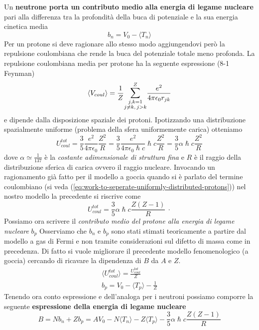 Un \textbf{neutrone porta un contributo medio alla energia di legame nucleare} pari alla differenza tra la profondità della buca di potenziale e la sua energia cinetica media
\[
b_{n} = V_{0} - \langle T_{n} \rangle
\]
Per un protone si deve ragionare allo stesso modo aggiungendovi però la repulsione coulombiana che rende la buca del potenziale totale meno profonda.
La repulsione coulombiana media per protone ha la seguente espressione (8-1 Feynman\cite{FeynLect2})
\[
	\langle V_{coul} \rangle = \frac{1}{Z} \mathlarger{\sum}_{\substack{j,k=1 \\ j \neq k, \,j > k  }}^{Z} \frac{e^{2}}{4 \pi \epsilon_{0}r_{jk}}\]
e dipende dalla disposizione spaziale dei protoni.
Ipotizzando una distribuzione spazialmente uniforme (problema della sfera uniformemente carica) otteniamo
\[
U_{coul}^{tot} = \frac{3}{5} \frac{e^{2}}{4 \pi \epsilon_{0}} \frac{Z^{2}}{R} = \frac{3}{5} \frac{e^{2}}{4 \pi \epsilon_{0} \hslash c} \hslash c \frac{Z^{2}}{R} = \frac{3}{5} \alpha \hslash c \frac{Z^{2}}{R}
\]
dove $\alpha \simeq \frac{1}{137}$ è la \emph{costante adimensionale di struttura fina} e $R$ è il raggio della distribuzione sferica di carica ovvero il raggio nucleare.
Invocando un ragionamento già fatto per il modello a goccia quando si è parlato del termine coulombiano (si veda (\ref{eq:work-to-seperate-uniformly-distributed-protons})) nel nostro modello la precedente si riscrive come
\[
U_{coul}^{tot} = \frac{3}{5} \alpha \hslash c \frac{Z (Z-1)}{R} \ \cdot
\]
Possiamo ora scrivere il \emph{contributo medio del protone alla energia di legame nucleare} $b_{p}$\sidenote
{
Osserviamo che $ b_n$ e $ b_p$ sono stati stimati teoricamente a partire dal modello a gas di Fermi e non tramite
considerazioni sul difetto di massa come in precedenza. Di fatto si vuole migliorare il precedente modello fenomenologico
(a goccia) cercando di ricavare la dipendenza di $ B$ da $ A$ e $ Z$.
}
\begin{gather*}
    \langle U^{tot}_{coul} \rangle = \frac{U^{tot}_{coul}}{Z}\\
    b_{p} = V_{0} - \langle T_{p} \rangle  - \frac{1}{Z}
\end{gather*}
Tenendo ora conto espressione e dell’analoga per i neutroni possiamo comporre la seguente \textbf{espressione della energia di legame nucleare}
\begin{equation}
	B = N b_{n} + Z b_{p} = A V_{0} - N \langle T_{n} \rangle - Z \langle T_{p} \rangle - \frac{3}{5} \alpha \hslash c \frac{Z(Z-1)}{R}
	\label{eq:binding-energy-fermi-gas-model}
\end{equation}


